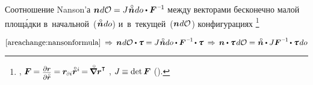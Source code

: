 \begin{otherlanguage}{russian}

Соотношение Nanson’а ${\currentunitnormal \hspace{.1ex} d\mathcal{O} = J \hspace{.1ex} \initialunitnormal \hspace{.1ex} do \dotp \bm{F}^{\hspace{.1ex}\expminusone} \hspace{-0.1ex}}$ между векторами бесконечно малой площ\'{а}дки в~начальной~(${\initialunitnormal \hspace{.1ex} do}$) и~в~текущей~(${\bm{n} \hspace{.1ex} d\mathcal{O}}$) конфигурациях%
\footnote{,
${\bm{F} \hspace{-0.1ex}
= \scalebox{0.8}{$ \displaystyle \frac{\raisemath{-0.2em}{\partial \currentlocationvector}}{\raisemath{-0.1em}{\partial \initiallocationvector}} $}
= \hspace{-0.1ex} \currentlocationvector_\differentialindex{i} \initiallocationvector^{i} \hspace{-0.2ex}
= \hspace{-0.2ex} \boldnablacircled \currentlocationvector^{\T} \hspace{-0.2ex}}$\ru{\:---} , ${J \hspace{-0.1ex} \equiv \operatorname{det} \bm{F}\hspace{-0.12ex}}$\ru{\:---}  ().}

\nopagebreak\vspace{-0.12em}\begin{equation*}
\eqref{areachange:nansonformula}
\:\Rightarrow\,
\currentunitnormal \hspace{.1ex} d\mathcal{O} \dotp \cauchystress
= J \hspace{.1ex} \initialunitnormal do \dotp \bm{F}^{\hspace{.1ex}\expminusone} \hspace{-0.2ex} \dotp \cauchystress
\:\Rightarrow\,
\currentunitnormal \dotp \cauchystress \hspace{.25ex} d\mathcal{O}
= \hspace{.1ex} \initialunitnormal \dotp J \bm{F}^{\hspace{.1ex}\expminusone} \hspace{-0.2ex} \dotp \cauchystress \hspace{.2ex} do
\end{equation*}


\end{otherlanguage}
